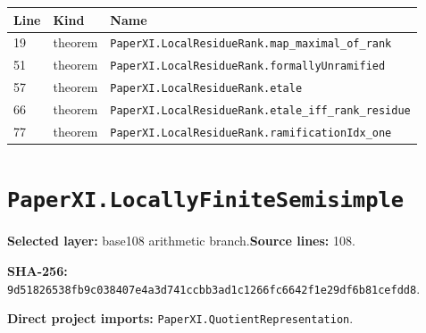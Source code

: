 \documentclass[10pt,oneside]{book}
\begin{document}
\begin{longtable}{@{}p{}p{}p{}@{}}\toprule Line&Kind&Name\\\midrule\endhead

19&theorem&\nolinkurl{PaperXI.LocalResidueRank.map_maximal_of_rank}\\

51&theorem&\nolinkurl{PaperXI.LocalResidueRank.formallyUnramified}\\

57&theorem&\nolinkurl{PaperXI.LocalResidueRank.etale}\\

66&theorem&\nolinkurl{PaperXI.LocalResidueRank.etale_iff_rank_residue}\\

77&theorem&\nolinkurl{PaperXI.LocalResidueRank.ramificationIdx_one}\\

\bottomrule\end{longtable}

\section{\texorpdfstring{\nolinkurl{PaperXI.LocallyFiniteSemisimple}}{PaperXI.LocallyFiniteSemisimple}}\label{module:PaperXI.LocallyFiniteSemisimple}

\textbf{Selected layer:} base108 arithmetic branch.\quad\textbf{Source lines:} 108.\par\textbf{SHA-256:} {\scriptsize\nolinkurl{9d51826538fb9c038407e4a3d741ccbb3ad1c1266fc6642f1e29df6b81cefdd8}}.


\textbf{Direct project imports:} \nolinkurl{PaperXI.QuotientRepresentation}.
\end{document}
